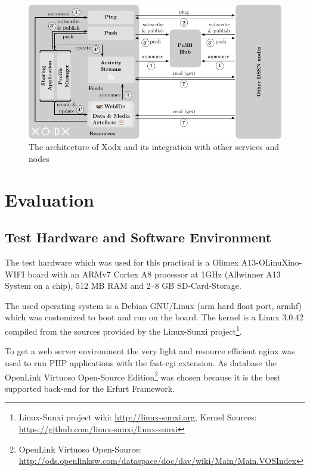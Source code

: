 \documentclass{llncs}
\begin{document}
\begin{figure}
    \begin{center}
        \includegraphics[width=.687\textwidth]{graphics/Xodx-in-DSSN-Architecture}
    \end{center}
\caption{The architecture of Xodx and its integration with other services and nodes}
\label{Xodx_arch}
\end{figure}


\section{Evaluation}

\subsection{Test Hardware and Software Environment}
The test hardware which was used for this practical is a Olimex A13-OLinuXino-WIFI board with an ARMv7 Cortex A8 processor at 1GHz (Allwinner A13 System on a chip), 512 MB RAM and 2–8 GB SD-Card-Storage.

The used operating system is a Debian GNU/Linux (arm hard float port, armhf) which was customized to boot and run on the board.
The kernel is a Linux 3.0.42 compiled from the sources provided by the Linux-Sunxi project\footnote{Linux-Sunxi project wiki: \url{http://linux-sunxi.org}, Kernel Sources: \url{https://github.com/linux-sunxi/linux-sunxi}}.

To get a web server environment the very light and resource efficient nginx was used to run PHP applications with the fast-cgi extension.
As database the Open\-Link Vir\-tu\-oso Open-Source Edition\footnote{Open\-Link Vir\-tu\-oso Open-Source: \url{http://ods.openlinksw.com/dataspace/doc/dav/wiki/Main/Main.VOSIndex}} was chosen because it is the best supported back-end for the Erfurt Framework.




\end{document}
